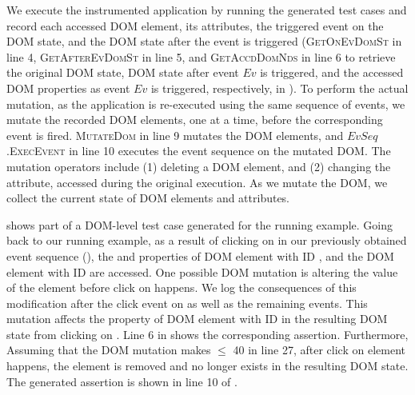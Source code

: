 We execute the instrumented application by running the generated \selenium test cases and record each accessed DOM element,
 its attributes, the triggered event on the DOM state, and the DOM state after the event is triggered (\textsc{GetOnEvDomSt} in line 4, \textsc{GetAfterEvDomSt} in line 5, and \textsc{GetAccdDomNds} in line 6 to retrieve the original DOM state, DOM state after event $Ev$ is triggered, and the accessed DOM properties as event $Ev$ is triggered, respectively, in ). To perform the actual mutation, as the application is re-executed using the same sequence of events, we mutate the recorded DOM elements, one at a time, before the corresponding event is fired. \textsc{MutateDom} in line 9 mutates the DOM elements, and $EvSeq$\textsc{.ExecEvent} in line 10 executes the event sequence on the mutated DOM. 
The mutation operators include (1) deleting a DOM element, and (2) changing the attribute, accessed during the original execution. 
As we mutate the DOM, we collect the current state of DOM elements and attributes. 

 shows part of a DOM-level test case generated for the running example.
Going back to our running example, as a result of clicking on  in our previously obtained event sequence (),
the  and  properties of DOM element with ID , and the DOM element with ID  are accessed. One possible DOM mutation is altering the  value of the  element before click on  happens. %
We log the consequences of this modification after the click event on  as well as the remaining events.
This mutation affects the  property of DOM element with ID  in the resulting DOM state from clicking on . Line 6 in  shows the corresponding assertion.
Furthermore, Assuming that the DOM mutation makes $\leq$ 40 in line 27, after click on element  happens, the element is removed and no longer exists in the resulting DOM state. The generated assertion is shown in line 10 of . 




